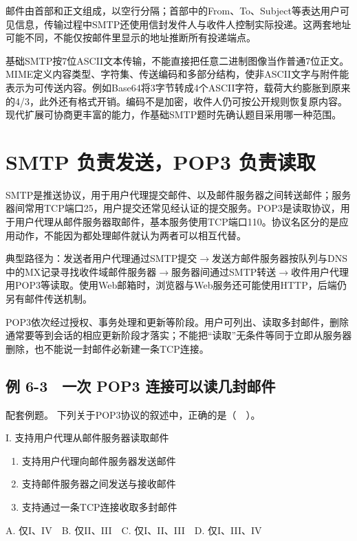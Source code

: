 邮件由首部和正文组成，以空行分隔；首部中的From、To、Subject等表达用户可见信息，传输过程中SMTP还使用信封发件人与收件人控制实际投递。这两套地址可能不同，不能仅按邮件里显示的地址推断所有投递端点。

基础SMTP按7位ASCII文本传输，不能直接把任意二进制图像当作普通7位正文。MIME定义内容类型、字符集、传送编码和多部分结构，使非ASCII文字与附件能表示为可传送内容。例如Base64将3字节转成4个ASCII字符，载荷大约膨胀到原来的4/3，此外还有格式开销。编码不是加密，收件人仍可按公开规则恢复原内容。现代扩展可协商更丰富的能力，作基础SMTP题时先确认题目采用哪一种范围。

\section{SMTP 负责发送，POP3 负责读取}\label{CN06-06}

SMTP是推送协议，用于用户代理提交邮件、以及邮件服务器之间转送邮件；服务器间常用TCP端口25，用户提交还常见经认证的提交服务。POP3是读取协议，用于用户代理从邮件服务器取邮件，基本服务使用TCP端口110。协议名区分的是应用动作，不能因为都处理邮件就认为两者可以相互代替。

典型路径为：发送者用户代理通过SMTP提交\ensuremath{\to}发送方邮件服务器按队列与DNS中的MX记录寻找收件域邮件服务器\ensuremath{\to}服务器间通过SMTP转送\ensuremath{\to}收件用户代理用POP3等读取。使用Web邮箱时，浏览器与Web服务还可能使用HTTP，后端仍另有邮件传送机制。

POP3依次经过授权、事务处理和更新等阶段。用户可列出、读取多封邮件，删除通常要等到会话的相应更新阶段才落实；不能把``读取''无条件等同于立即从服务器删除，也不能说一封邮件必新建一条TCP连接。

\subsection{例 6-3　一次 POP3 连接可以读几封邮件}\label{CN06-ex3}

\begin{example}[配套例题]

配套例题。 下列关于POP3协议的叙述中，正确的是（　）。

I. 支持用户代理从邮件服务器读取邮件

\begin{enumerate}
\def\labelenumi{\Roman{enumi}.}
\setcounter{enumi}{1}
\item
  支持用户代理向邮件服务器发送邮件
\item
  支持邮件服务器之间发送与接收邮件
\item
  支持通过一条TCP连接收取多封邮件
\end{enumerate}

A. 仅I、IV　B. 仅II、III　C. 仅I、II、III　D. 仅I、III、IV

\end{example}

